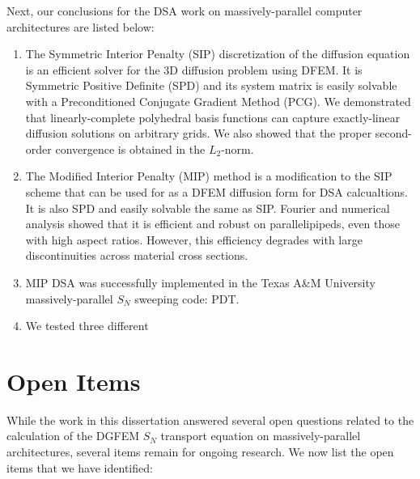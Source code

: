 Next, our conclusions for the DSA work on massively-parallel computer architectures are listed below:

\begin{enumerate}
\item The Symmetric Interior Penalty (SIP) discretization of the diffusion equation is an efficient solver for the 3D diffusion problem using DFEM. It is Symmetric Positive Definite (SPD) and its system matrix is easily solvable with a Preconditioned Conjugate Gradient Method (PCG). We demonstrated that linearly-complete polyhedral basis functions can capture exactly-linear diffusion solutions on arbitrary grids. We also showed that the proper second-order convergence is obtained in the $L_2$-norm.
\item The Modified Interior Penalty (MIP) method is a modification to the SIP scheme that can be used for as a DFEM diffusion form for DSA calcualtions. It is also SPD and easily solvable the same as SIP. Fourier and numerical analysis showed that it is efficient and robust on parallelipipeds, even those with high aspect ratios. However, this efficiency degrades with large discontinuities across material cross sections.
\item MIP DSA was successfully implemented in the Texas A\&M University massively-parallel $S_N$ sweeping code: PDT.
\item We tested three different 
\end{enumerate}

\section{Open Items}
\label{sec::Conclusions_Open_Items}

While the work in this dissertation answered several open questions related to the calculation of the DGFEM $S_N$ transport equation on massively-parallel architectures, several items remain for ongoing research. We now list the open items that we have identified:

